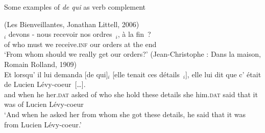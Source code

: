 \begin{exe}
\ex Some examples of \emph{de qui} as verb complement\label{ex:dq2000-verb-qu}
\begin{xlist}
   \ex (Les Bienveillantes, Jonathan Littell, 2006)\\
\gll [De qui]$_i$ devons - nous recevoir nos ordres~\trace{}$_i$, à la fin~?\\
of who must {} we receive\textsc{.inf} our orders at the end\\
\glt `From whom should we really get our orders?'
\pagebreak
\ex (Jean-Christophe : Dans la maison, Romain Rolland, 1909)\\
\gll Et lorsqu' il lui demanda [de qui]$_i$ [elle tenait ces détails~\trace{}$_i$], elle lui dit que c' était de Lucien Lévy-coeur~[\dots].\\
and when he her\textsc{.dat} asked of who she hold these details she him\textsc{.dat} said that it was of Lucien Lévy-coeur\\
\glt `And when he asked her from whom she got these details, he said that it was from Lucien Lévy-coeur.' 
\end{xlist}
\end{exe}

